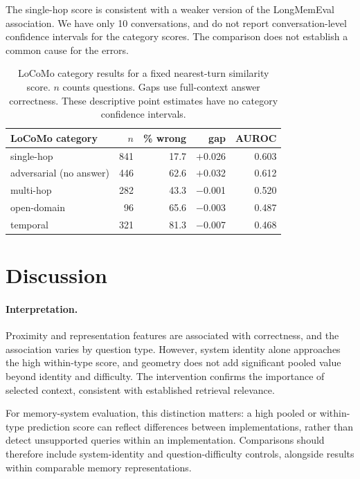 \documentclass{article}
\begin{document}
The single-hop score is consistent with a weaker version of the LongMemEval
association. We have only 10 conversations, and do not report
conversation-level confidence intervals for the category scores.
The comparison does not establish a common cause for the errors.

\begin{table}[h]
  \centering\small
  \caption{LoCoMo category results for a fixed nearest-turn similarity score.
  $n$ counts questions. Gaps use full-context answer correctness.
  These descriptive point estimates have no category confidence intervals.}
  \label{tab:locomo}
  \begin{tabular}{lrrrr}
    \toprule
    LoCoMo category & $n$ & \% wrong & gap & AUROC \\
    \midrule
    single-hop            & 841 & 17.7 & $+$0.026 & 0.603 \\
    adversarial (no answer)& 446 & 62.6 & $+$0.032 & 0.612 \\
    multi-hop             & 282 & 43.3 & $-$0.001 & 0.520 \\
    open-domain           & 96 & 65.6 & $-$0.003 & 0.487 \\
    temporal              & 321 & 81.3 & $-$0.007 & 0.468 \\
    \bottomrule
  \end{tabular}
\end{table}

\section{Discussion}
\label{sec:discussion}

\paragraph{Interpretation.}
Proximity and representation features are associated with correctness,
and the association varies by question type.
However, system identity alone approaches the high within-type score,
and geometry does not add significant pooled value beyond identity and difficulty.
The intervention confirms the importance of selected context,
consistent with established retrieval relevance.

For memory-system evaluation, this distinction matters: a high pooled or
within-type prediction score can reflect differences between implementations,
rather than detect unsupported queries within an implementation.
Comparisons should therefore include system-identity and question-difficulty
controls, alongside results within comparable memory representations.
\end{document}
